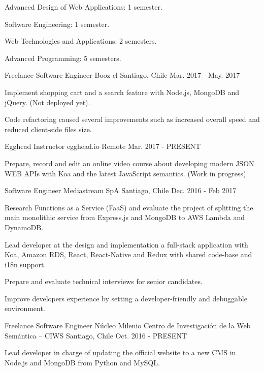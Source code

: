 \begin{cventries}
{\begin{cvitems}
        \item {Advanced Design of Web Applications: 1 semester.}
        \item {Software Engineering: 1 semester.}
        \item {Web Technologies and Applications: 2 semesters.}
        \item {Advanced Programming: 5 semesters.}
      \end{cvitems}
    }
  \cventry
    {Freelance Software Engineer}
    {Booz cl}
    {Santiago, Chile}
    {Mar. 2017 - May. 2017}
    {
      \begin{cvitems}
        \item {Implement shopping cart and a search feature with Node.js, MongoDB and jQuery. (Not deployed yet).}
        \item {Code refactoring caused several improvements such as increased overall speed and reduced client-side files size.}
      \end{cvitems}
    }
  \cventry
    {Egghead Instructor}
    {egghead.io}
    {Remote}
    {Mar. 2017 - PRESENT}
    {
      \begin{cvitems}
        \item {Prepare, record and edit an online video course about developing modern JSON WEB APIs with Koa and the latest JavaScript semantics. (Work in progress).}
      \end{cvitems}
    }
  \cventry
    {Software Engineer}
    {Mediastream SpA}
    {Santiago, Chile}
    {Dec. 2016 - Feb 2017}
    {
      \begin{cvitems}
        \item {Research Functions as a Service (FaaS) and evaluate the project of splitting the main monolithic service from Express.js and MongoDB to AWS Lambda and DynamoDB.}
        \item {Lead developer at the design and implementation a full-stack application with Koa, Amazon RDS, React, React-Native and Redux with shared code-base and i18n support.}
        \item {Prepare and evaluate technical interviews for senior candidates.}
        \item {Improve developers experience by setting a developer-friendly and debuggable environment.}
      \end{cvitems}
    }
  \cventry
    {Freelance Software Engineer}
    {Núcleo Milenio Centro de Investigación de la Web Semántica – CIWS}
    {Santiago, Chile}
    {Oct. 2016 - PRESENT}
    {
      \begin{cvitems}
        \item {Lead developer in charge of updating the official website to a new CMS in Node.js and MongoDB from Python and MySQL.}
      \end{cvitems}
    }
\end{cventries}
